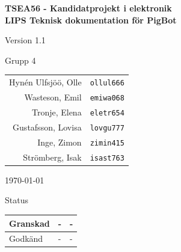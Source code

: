 \documentclass[11pt]{article}
\begin{document}
\begin{titlepage}
\begin{center}

{\Large\bfseries TSEA56 - Kandidatprojekt i elektronik \\ LIPS Teknisk dokumentation för PigBot}

\vspace{5em}

Version 1.1

\vspace{5em}
Grupp 4 \\
\begin{tabular}{rl}
Hynén Ulfsjöö, Olle&\verb+ollul666+
\\
Wasteson, Emil&\verb+emiwa068+
\\
Tronje, Elena&\verb+eletr654+
\\
Gustafsson, Lovisa&\verb+lovgu777+
\\
Inge, Zimon&\verb+zimin415+
\\
Strömberg, Isak&\verb+isast763+
\\
\end{tabular}

\vspace{5em}
\today

\vspace{16em}
Status
\begin{longtable}{|l|l|l|} \hline

Granskad & - & - \\ \hline
Godkänd & - & - \\ \hline
 
\end{longtable}

\end{center}
\end{titlepage}
\end{document}
